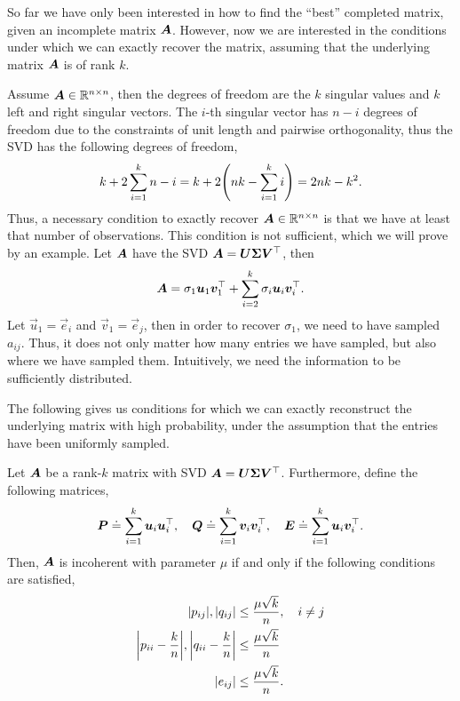 So far we have only been interested in how to find the ``best'' completed matrix, given an
incomplete matrix $\bm{A}$. However, now we are interested in the conditions under which we can
exactly recover the matrix, assuming that the underlying matrix $\bm{A}$ is of rank $k$.

Assume $\bm{A} \in \mathbb{R}^{n \times n}$, then the degrees of freedom are the $k$ singular values and
$k$ left and right singular vectors. The $i$-th singular vector has $n-i$ degrees of freedom due to
the constraints of unit length and pairwise orthogonality, thus the SVD has the following degrees
of freedom, \[
    k + 2\sum_{i=1}^{k} n - i = k + 2 \lft( nk - \sum_{i=1}^{k} i \rgt) = 2nk - k^2.
\]
Thus, a necessary condition to exactly recover $\bm{A} \in \mathbb{R}^{n\times n}$ is that we have at
least that number of observations. This condition is not sufficient, which we will prove by an
example. Let $\bm{A}$ have the SVD $\bm{A} = \bm{U} \bm{\Sigma} \bm{V}^\top$, then \[
    \bm{A} = \sigma_1 \bm{u}_1 \bm{v}_1^\top + \sum_{i=2}^{k} \sigma_i \bm{u}_i \bm{v}_i^\top.
\]
Let $\vec{u}_1 = \vec{e}_i$ and $\vec{v}_1 = \vec{e}_j$, then in order to recover $\sigma_1$, we
need to have sampled $a_{ij}$. Thus, it does not only matter how many entries we have sampled, but
also where we have sampled them. Intuitively, we need the information to be sufficiently
distributed.

The following gives us conditions for which we can exactly reconstruct the underlying matrix with
high probability, under the assumption that the entries have been uniformly sampled.

\begin{definition}[Incoherence]
    Let $\bm{A}$ be a rank-$k$ matrix with SVD $\bm{A} = \bm{U} \bm{\Sigma} \bm{V}^\top$.
    Furthermore, define the following matrices, \[
        \bm{P} \doteq \sum_{i=1}^{k} \bm{u}_i \bm{u}_i^\top, \quad \bm{Q} \doteq \sum_{i=1}^{k} \bm{v}_i \bm{v}_i^\top, \quad \bm{E} \doteq \sum_{i=1}^{k} \bm{u}_i \bm{v}_i^\top.
    \]
    Then, $\bm{A}$ is incoherent with parameter $\mu$ if and only if the following conditions are
    satisfied,
    \begin{align*}
        |p_{ij}|, |q_{ij}|                                                 & \leq \frac{\mu \sqrt{k}}{n}, \quad i \neq j \\
        \lft| p_{ii} - \frac{k}{n} \rgt|, \lft| q_{ii} - \frac{k}{n} \rgt| & \leq \frac{\mu \sqrt{k}}{n}                 \\
        |e_{ij}|                                                           & \leq \frac{\mu \sqrt{k}}{n}.
    \end{align*}
\end{definition}

